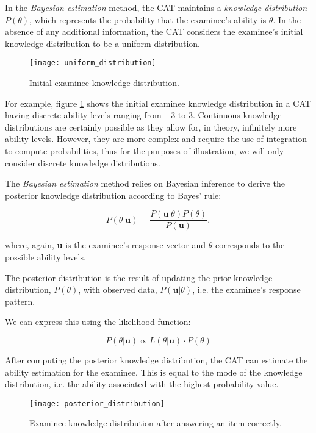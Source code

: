 In the \textit{Bayesian estimation} method, the CAT maintains a \textit{knowledge distribution} $P(\theta)$, which represents the probability that the examinee's ability is $\theta$. In the absence of any additional information, the CAT considers the examinee's initial knowledge distribution to be a uniform distribution.

\begin{figure}[H]
\centering
\texttt{[image: uniform\_distribution]}
\caption{Initial examinee knowledge distribution.}
\label{fig:uniform_distribution}
\end{figure}

For example, figure \ref{fig:uniform_distribution} shows the initial examinee knowledge distribution in a CAT having discrete ability levels ranging from $-3$ to $3$. Continuous knowledge distributions are certainly possible as they allow for, in theory, infinitely more ability levels. However, they are more complex and require the use of integration to compute probabilities, thus for the purposes of illustration, we will only consider discrete knowledge distributions. \newline

The \textit{Bayesian estimation} method relies on Bayesian inference to derive the posterior knowledge distribution according to Bayes' rule:

$$P(\theta | \textbf{u}) = \dfrac{P(\textbf{u} | \theta)P(\theta)}{P(\textbf{u})} ,$$

where, again, \textbf{u} is the examinee's response vector and $\theta$ corresponds to the possible ability levels.\newline

The posterior distribution is the result of updating the prior knowledge distribution, $P(\theta)$, with observed data, $P(\textbf{u} | \theta)$, i.e. the examinee's response pattern.\newpage

We can express this using the likelihood function:

$$P(\theta | \textbf{u}) \propto L(\theta | \textbf{u}) \cdot P(\theta)$$

After computing the posterior knowledge distribution, the CAT can estimate the ability estimation for the examinee. This is equal to the mode of the knowledge distribution, i.e. the ability associated with the highest probability value.

\begin{figure}[H]
\centering
\texttt{[image: posterior\_distribution]}
\caption{Examinee knowledge distribution after answering an item correctly.}
\label{fig:posterior_distribution}
\end{figure}

